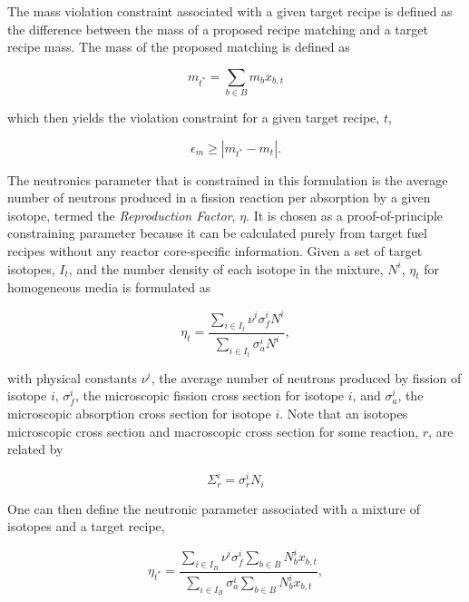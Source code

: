 The mass violation constraint associated with a given target recipe is defined
as the difference between the mass of a proposed recipe matching and a target
recipe mass. The mass of the proposed matching is defined as

\begin{equation}\label{eqs:mass-constraint}
m_{t^*} = \sum_{b \in B} m_{b} x_{b,t}
\end{equation}

which then yields the violation constraint for a given target recipe, $t$,

\begin{equation}\label{eqs:mass-constraint-simple}
\epsilon_{m} \geq \left| m_{t^*} - m_{t} \right|.
\end{equation}

The neutronics parameter that is constrained in this formulation is the average
number of neutrons produced in a fission reaction per absorption by a given
isotope, termed the \textit{Reproduction Factor}, $\eta$. It is chosen as a
proof-of-principle constraining parameter because it can be calculated purely
from target fuel recipes without any reactor core-specific information. Given a
set of target isotopes, $I_t$, and the number density of each isotope in the
mixture, $N^i$, $\eta_t$ for homogeneous media is formulated as

\begin{equation}
\label{eqs:eta_micro}
\eta_t = \frac{\sum_{i \in I_t} \nu^{i} \sigma_{f}^{i} N^{i}}
            {\sum_{i \in I_t} \sigma_{a}^{i} N^{i}},
\end{equation}

with physical constants $\nu^{i}$, the average number of neutrons produced by
fission of isotope $i$, $\sigma_{f}^{i}$, the microscopic fission cross section
for isotope $i$, and $\sigma_{a}^{i}$, the microscopic absorption cross section
for isotope $i$. Note that an isotopes microscopic cross section and macroscopic
cross section for some reaction, $r$, are related by

\begin{equation}\label{eqs:micro-macro}
\Sigma^i_r = \sigma^i_r N_i
\end{equation}

One can then define the neutronic parameter associated with a mixture of
isotopes and a target recipe,

\begin{equation}
\label{eqs:eta_fractions_nonlin}
\eta_{t^*} = \frac{\sum_{i \in I_{B}} \nu^{i} \sigma_{f}^{i} \sum_{b \in B} N_{b}^{i} x_{b,t}}
                {\sum_{i \in I_{B}} \sigma_{a}^{i} \sum_{b \in B} N_{b}^{i} x_{b,t}},
\end{equation}

